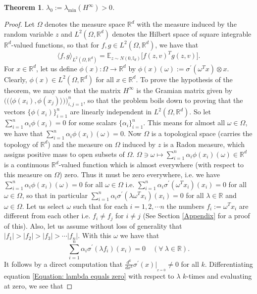 \documentclass[a4paper,11pt]{amsart}
\newcommand{\IE}{\mathbb{E}}
\newcommand{\innerl}{\Big\langle}
\newcommand{\innerr}{\Big\rangle}
\theoremstyle{definition}
\theoremstyle{plain}
\newtheorem{thm}[dfn]{Theorem}
\theoremstyle{remark}
\newcommand{\IR}{\mathbb{R}}
\newcommand{\ot}{\otimes}
\begin{document}
\begin{thm}\label{Theorem: Theorem 3.1 in overparametrized paper}
$\lambda_0:=\lambda_{\min}(H^\infty)>0$.    
\end{thm}
\begin{proof}
Let $\Omega$ denotes the measure space $\IR^d$ with the measure induced by the random variable $z$ and $L^2(\Omega,\IR^d)$ denotes the Hilbert space of square integrable $\IR^d$-valued functions, so that for $f,g\in L^2(\Omega,\IR^d)$, we have that \[\innerl f,g\innerr_{L^2(\Omega,\IR^d)}=\IE_{z\sim N(0,\mathbb{I}_d)}\Big[f(z,v)^Tg(z,v)\Big].\] For $x\in\IR^d$, let us define $\phi(x):\Omega\longrightarrow\IR^d$ by $\phi(x)(\omega):=\sigma^\prime(\omega^T x)\ot x$. Clearly, $\phi(x)\in L^2(\Omega,\IR^d)$ for all $x\in\IR^d$. To prove the hypothesis of the theorem, we may note that the matrix $H^\infty$ is the Gramian matrix given by $\Big(\Big(\innerl\phi(x_i),\phi(x_j)\innerr\Big)\Big)_{i,j=1}^n$, so that the problem boils down to proving that the vectors $\{\phi(x_i)\}_{i=1}^n$ are linearly independent in $L^2(\Omega,\IR^d)$. So let $\sum_{i=1}^n\alpha_i\phi(x_i)=0$ for some scalars $\{\alpha_i\}_{i=1}^n$. This means for almost all $\omega\in\Omega$, we have that $\sum_{i=1}^n\alpha_i\phi(x_i)(\omega)=0$. Now $\Omega$ is a topological space (carries the topology of $\IR^d$) and the measure on $\Omega$ induced by $z$ is a Radon measure, which assigns positive mass to open subsets of $\Omega$. $\Omega\ni\omega\mapsto\sum_{i=1}^n\alpha_i\phi(x_i)(\omega)\in\IR^d$ is a continuous $\IR^d$-valued function which is almost everywhere (with respect to this measure on $\Omega$) zero. Thus it must be zero everywhere, i.e. we have $\sum_{i=1}^n\alpha_i\phi(x_i)(\omega)=0$ for all $\omega\in\Omega$ i.e. $\sum_{i=1}^n\alpha_i\sigma^\prime(\omega^Tx_i)(x_i)=0$ for all $\omega\in\Omega$, so that in particular $\sum_{i=1}^n\alpha_i\sigma^\prime(\lambda\omega^Tx_i)(x_i)=0$ for all $\lambda\in\IR$ and $\omega\in\Omega$. Let us select $\omega$ such that for each $i=1,2,\cdots n$ the numbers $f_i:=\omega^Tx_i$ are different from each other i.e. $f_i\neq f_j$ for $i\neq j$ (See Section \ref{Appendix} for a proof of this). Also, let us assume without loss of generality that $|f_1|>|f_2|>|f_3|>\cdots |f_n|$. With this $\omega$ we have that 
\begin{equation}\label{Equation: lambda equals zero}
\sum_{i=1}^n\alpha_i\sigma^\prime(\lambda f_i)(x_i)=0\quad(\forall~\lambda\in\IR). 
\end{equation}
It follows by a direct computation that $\frac{d^k}{dx^k}\sigma^\prime(x)|_{_{x=0}}\neq0$ for all $k$. Differentiating equation \eqref{Equation: lambda equals zero} with respect to $\lambda$ $k$-times and evaluating at zero, we see that 

\end{proof}
\end{document}
